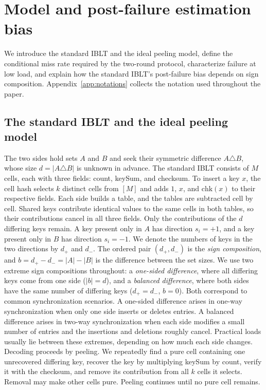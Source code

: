 \section{Model and post-failure estimation bias}\label{sec:model}
We introduce the standard IBLT and the ideal peeling model, define the conditional miss rate required by the two-round protocol, characterize failure at low load, and explain how the standard IBLT's post-failure bias depends on sign composition. Appendix~\ref{app:notations} collects the notation used throughout the paper.

\subsection{The standard IBLT and the ideal peeling model}
The two sides hold sets $A$ and $B$ and seek their symmetric difference $A\triangle B$, whose size $d=|A\triangle B|$ is unknown in advance. The standard IBLT consists of $M$ cells, each with three fields: count, keySum, and checksum. To insert a key $x$, the cell hash selects $k$ distinct cells from $[M]$ and adds $1$, $x$, and $\mathrm{chk}(x)$ to their respective fields. Each side builds a table, and the tables are subtracted cell by cell. Shared keys contribute identical values to the same cells in both tables, so their contributions cancel in all three fields. Only the contributions of the $d$ differing keys remain. A key present only in $A$ has direction $s_i=+1$, and a key present only in $B$ has direction $s_i=-1$. We denote the numbers of keys in the two directions by $d_+$ and $d_-$. The ordered pair $(d_+,d_-)$ is the \emph{sign composition}, and $b=d_+-d_-=|A|-|B|$ is the difference between the set sizes. We use two extreme sign compositions throughout: a \emph{one-sided difference}, where all differing keys come from one side ($|b|=d$), and a \emph{balanced difference}, where both sides have the same number of differing keys ($d_+=d_-$, $b=0$). Both correspond to common synchronization scenarios. A one-sided difference arises in one-way synchronization when only one side inserts or deletes entries. A balanced difference arises in two-way synchronization when each side modifies a small number of entries and the insertions and deletions roughly cancel. Practical loads usually lie between these extremes, depending on how much each side changes. Decoding proceeds by peeling. We repeatedly find a pure cell containing one unrecovered differing key, recover the key by multiplying keySum by count, verify it with the checksum, and remove its contribution from all $k$ cells it selects. Removal may make other cells pure. Peeling continues until no pure cell remains.


